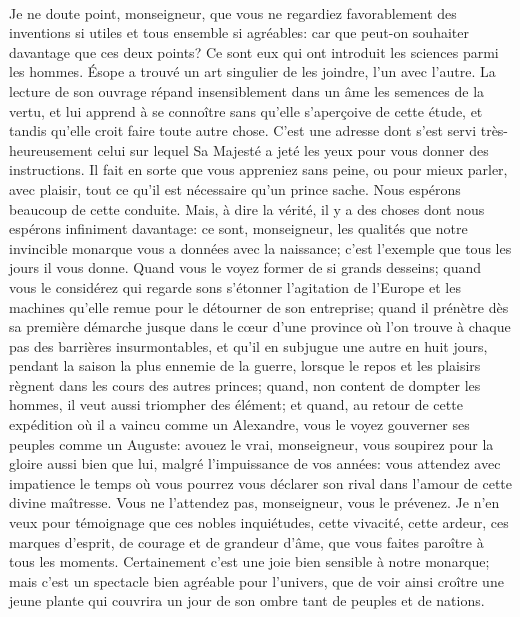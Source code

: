 \documentclass{book}
\begin{document}
\paragraph{}
Je ne doute point, monseigneur, que vous ne regardiez favorablement des inventions si utiles et tous ensemble si agr\'eables: car que peut-on souhaiter davantage que ces deux points? Ce sont eux qui ont introduit les sciences parmi les hommes. \'Esope a trouv\'e un art singulier de les joindre, l'un avec l'autre. La lecture de son ouvrage r\'epand insensiblement dans un \^ame les semences de la vertu, et lui apprend \`a se conno\^itre sans qu'elle s'aper\c coive de cette \'etude, et tandis qu'elle croit faire toute autre chose. C'est une adresse dont s'est servi tr\`es-heureusement celui sur lequel Sa Majest\'e a jet\'e les yeux pour vous donner des instructions. Il fait en sorte que vous appreniez sans peine, ou pour mieux parler, avec plaisir, tout ce qu'il est n\'ecessaire qu'un prince sache. Nous esp\'erons beaucoup de cette conduite. Mais, \`a dire la v\'erit\'e, il y a des choses dont nous esp\'erons infiniment davantage: ce sont, monseigneur, les qualit\'es que notre invincible monarque vous a donn\'ees avec la naissance; c'est l'exemple que tous les jours il vous donne. Quand vous le voyez former de si grands desseins; quand vous le consid\'erez qui regarde sons s'\'etonner l'agitation de l'Europe et les machines qu'elle remue pour le d\'etourner de son entreprise; quand il pr\'en\`etre d\`es sa premi\`ere d\'emarche jusque dans le c\oe ur d'une province o\`u l'on trouve \`a chaque pas des barri\`eres insurmontables, et qu'il en subjugue une autre en huit jours, pendant la saison la plus ennemie de la guerre, lorsque le repos et les plaisirs r\`egnent dans les cours des autres princes; quand, non content de dompter les hommes, il veut aussi triompher des \'el\'ement; et quand, au retour de cette exp\'edition o\`u il a vaincu comme un Alexandre, vous le voyez gouverner ses peuples comme un Auguste: avouez le vrai, monseigneur, vous soupirez pour la gloire aussi bien que lui, malgr\'e l'impuissance de vos ann\'ees: vous attendez avec impatience le temps o\`u vous pourrez vous d\'eclarer son rival dans l'amour de cette divine ma\^itresse. Vous ne l'attendez pas, monseigneur, vous le pr\'evenez. Je n'en veux pour t\'emoignage que ces nobles inqui\'etudes, cette vivacit\'e, cette ardeur, ces marques d'esprit, de courage et de grandeur d'\^ame, que vous faites paro\^itre \`a tous les moments. Certainement c'est une joie bien sensible \`a notre monarque; mais c'est un spectacle bien agr\'eable pour l'univers, que de voir ainsi cro\^itre une jeune plante qui couvrira un jour de son ombre tant de peuples et de nations.
\end{document}
